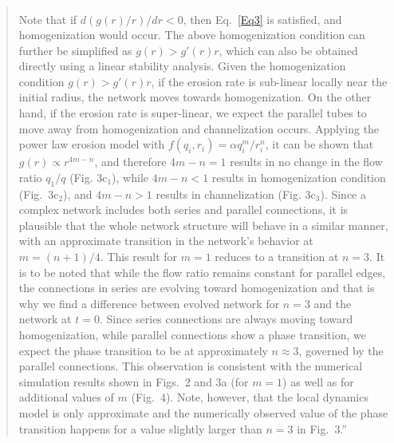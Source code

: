 \documentclass{article}
\begin{document}
{\begin{quote}
\begin{align}
    \end{align}
    Note that if $d\left(g(r)/r\right)/dr<0$, then Eq.~\eqref{Eq3} is satisfied, and homogenization would occur.
    The above homogenization condition can further be simplified as $g(r)>g'(r)r$, which can also be obtained directly using a linear stability analysis. Given the homogenization condition $g(r)>g'(r)r$, if the erosion rate is sub-linear locally near the initial radius, the network moves towards homogenization. On the other hand, if the erosion rate is super-linear, we expect the parallel tubes to move away from homogenization and channelization occurs. Applying the power law erosion model with $f(q_{i},r_i)=\alpha q_i^m/r_i^n$, it can be shown that $g(r) \propto  r^{4m-n} $, and therefore $4m-n=1$ results in no change in the flow ratio $q_1/q$ (Fig. 3c$_1$), while $4m-n<1$ results in homogenization condition (Fig.~3c$_2$), and $4m-n>1$ results in channelization (Fig. 3c$_3$). Since a complex network includes both series and parallel connections, it is plausible that the whole network structure will behave in a similar manner, with an approximate transition in the network's behavior at $ m = (n+1)/4$. This result for $m=1$ reduces to a transition at $n=3$. It is to be noted that while the flow ratio remains constant for parallel edges, the connections in series are evolving toward homogenization and that is why we find a difference between evolved network for $n=3$ and the network at $t=0$. Since series connections are always moving toward homogenization, while parallel connections show a phase transition, we expect the phase transition to be at approximately $n\approx 3$, governed by the parallel connections. This observation  is consistent with the numerical simulation results shown in Figs.~2 and 3a (for $m=1$) as well as for additional values of $m$ (Fig.~4). Note, however, that the local dynamics model is only approximate and the numerically observed value of the phase transition happens for a value slightly larger than $n=3$ in Fig.~3.''
    \end{quote}
}
\\
\newline 
\vspace{4mm}
\end{document}

